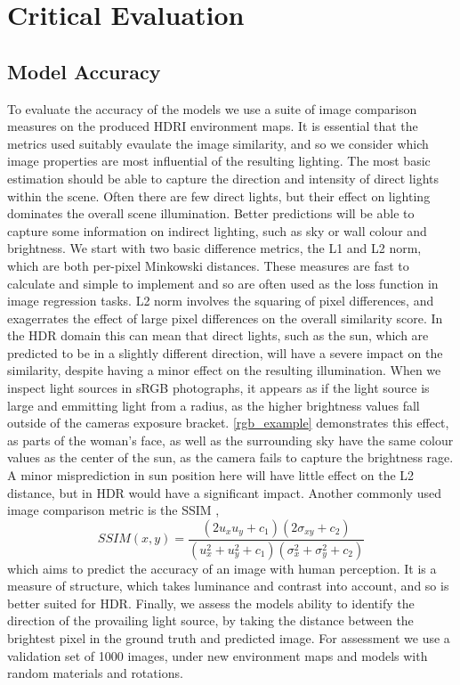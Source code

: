 \documentclass[ %
                    author={Gavin Parker},
                supervisor={Dr. Neill Campbell},
                    degree={MEng},
                     title={Deep Siamese Networks for Illumination Estimation from Stereo Images},
                  subtitle={},
                      type={research},
                      year={2018} ]{dissertation}
\begin{document}
\chapter{Critical Evaluation}
\label{chap:evaluation}

\section{Model Accuracy}
To evaluate the accuracy of the models we use a suite of image comparison measures on the produced HDRI environment maps. It is essential that the metrics used suitably evaulate the image similarity, and so we consider which image properties are most influential of the resulting lighting. The most basic estimation should be able to capture the direction and intensity of direct lights within the scene. Often there are few direct lights, but their effect on lighting dominates the overall scene illumination. Better predictions will be able to capture some information on indirect lighting, such as sky or wall colour and brightness.
\newline 
We start with two basic difference metrics, the L1 and L2 norm, which are both per-pixel Minkowski distances. These measures are fast to calculate and simple to implement and so are often used as the loss function in image regression tasks. L2 norm involves the squaring of pixel differences, and exagerrates the effect of large pixel differences on the overall similarity score. In the HDR domain this can mean that direct lights, such as the sun, which are predicted to be in a slightly different direction, will have a severe impact on the similarity, despite having a minor effect on the resulting illumination. When we inspect light sources in sRGB photographs, it appears as if the light source is large and emmitting light from a radius, as the higher brightness values fall outside of the cameras exposure bracket. \ref{rgb_example} demonstrates this effect, as parts of the woman's face, as well as the surrounding sky have the same colour values as the center of the sun, as the camera fails to capture the brightness rage. A minor misprediction in sun position here will have little effect on the L2 distance, but in HDR would have a significant impact.
\newline
Another commonly used image comparison metric is the SSIM \cite{1284395},
\[SSIM(x,y) = \frac{(2u_xu_y + c_1)(2\sigma_{xy} + c_2)}{(u^2_x + u^2_y + c_1)(\sigma^2_x + \sigma^2_y + c_2)}\]
which aims to predict the accuracy of an image with human perception. It is a measure of structure, which takes luminance and contrast into account, and so is better suited for HDR. Finally, we assess the models ability to identify the direction of the provailing light source, by taking the distance between the brightest pixel in the ground truth and predicted image. For assessment we use a validation set of 1000 images, under new environment maps and models with random materials and rotations.
\end{document}
